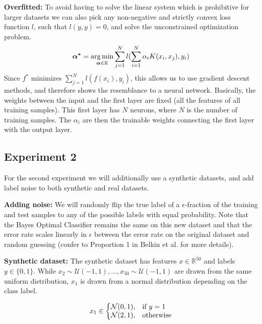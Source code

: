 \textbf{Overfitted:} To avoid having to solve the linear system which is prohibitive for larger datasets we can also pick any non-negative and strictly convex loss function $l$, such that $l(y, y) = 0$, and solve the unconstrained optimization problem.
\begin{equation}
    \boldsymbol{\alpha^*} = \operatorname*{arg\,min}_{\boldsymbol{\alpha} \in \mathbb{R}} \sum_{j=1}^{N} l(\sum_{i=1}^{N} \alpha_{i} K(x_{i} ,x_{j}), y_i)
\end{equation}
Since $f^*$ minimizes $\sum_{j=1}^{N} l(f(x_i), y_i)$, this allows us to use gradient descent methods, and therefore shows the resemblance to a neural network. Basically, the weights between the input and the first layer are fixed (all the features of all training samples). This first layer has $N$ neurons, where $N$ is the number of training samples. The $\alpha_i$ are then the trainable weights connecting the first layer with the output layer.

\subsection{Experiment 2}

For the second experiment we will additionally use a synthetic datasets, and add label noise to both synthetic and real datasets.


\textbf{Adding noise:} We will randomly flip the true label of a $\epsilon$-fraction of the training and test samples to any of the possible labels with equal probability. Note that the Bayes Optimal Classifier remains the same on this new dataset and that the error rate scales linearly in $\epsilon$ between the error rate on the original dataset and random guessing (confer to Proportion 1 in Belkin et al. \cite{belkin2018a} for more details).

\textbf{Synthetic dataset:} The synthetic dataset has features $x \in \mathbb{R}^{50}$ and labels $y \in \{0, 1\}$. While $x_2 \sim \mathcal{U}(-1, 1), ..., x_{50} \sim \mathcal{U}(-1, 1)$ are drawn from the same uniform distribution, $x_1$ is drawn from a normal distribution depending on the class label.

\begin{equation}
x_1 \in \left\{
\begin{array}{@{}ll@{}}
    \mathcal{N}(0, 1), & \text{if}\ y=1 \\
    \mathcal{N}(2, 1), & \text{otherwise}
\end{array}\right.
\end{equation}

